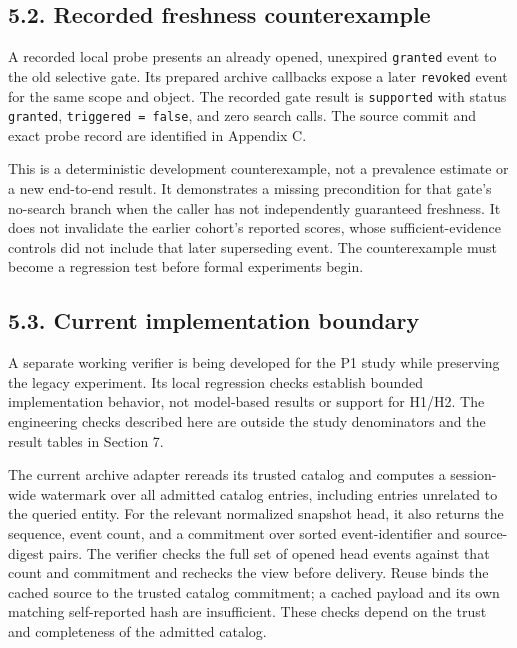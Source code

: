 \documentclass[
  11pt,
  a4paper,
]{article}
\begin{document}
\subsection{5.2. Recorded freshness
counterexample}\label{recorded-freshness-counterexample}

A recorded local probe presents an already opened, unexpired
\texttt{granted} event to the old selective gate. Its prepared archive
callbacks expose a later \texttt{revoked} event for the same scope and
object. The recorded gate result is \texttt{supported} with status
\texttt{granted}, \texttt{triggered\ =\ false}, and zero search calls.
The source commit and exact probe record are identified in Appendix C.

This is a deterministic development counterexample, not a prevalence
estimate or a new end-to-end result. It demonstrates a missing
precondition for that gate's no-search branch when the caller has not
independently guaranteed freshness. It does not invalidate the earlier
cohort's reported scores, whose sufficient-evidence controls did not
include that later superseding event. The counterexample must become a
regression test before formal experiments begin.

\subsection{5.3. Current implementation
boundary}\label{current-implementation-boundary}

A separate working verifier is being developed for the P1 study while
preserving the legacy experiment. Its local regression checks establish
bounded implementation behavior, not model-based results or support for
H1/H2. The engineering checks described here are outside the study
denominators and the result tables in Section 7.

The current archive adapter rereads its trusted catalog and computes a
session-wide watermark over all admitted catalog entries, including
entries unrelated to the queried entity. For the relevant normalized
snapshot head, it also returns the sequence, event count, and a
commitment over sorted event-identifier and source-digest pairs. The
verifier checks the full set of opened head events against that count
and commitment and rechecks the view before delivery. Reuse binds the
cached source to the trusted catalog commitment; a cached payload and
its own matching self-reported hash are insufficient. These checks
depend on the trust and completeness of the admitted catalog.
\end{document}
